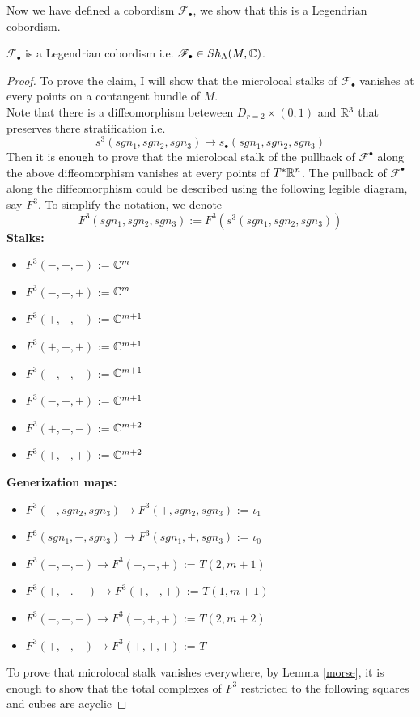 Now we have defined a cobordism $\mathscr{F}_\bullet$, we show that this is a Legendrian cobordism.
\begin{proposition}
$\mathscr{F}_\bullet$ is a Legendrian cobordism i.e. $\mathscr{F}_\bullet \in Sh_\Lambda(M,\mathbb{C})$.
\end{proposition}
\begin{proof}
To prove the claim, I will show that the microlocal stalks of $\mathscr{F}_\bullet$ vanishes at every points on a contangent bundle of $M$.\\
Note that there is a diffeomorphism beteween $D_{r=2} \times (0,1)$ and $\mathbb{R}^3$ that preserves there stratification i.e.
\[
s^3(sgn_1,sgn_2,sgn_3) \mapsto s_\bullet(sgn_1,sgn_2,sgn_3)
\]
Then it is enough to prove that the microlocal stalk of the pullback of $\mathscr{F}^\bullet$ along the above diffeomorphism vanishes at every points of $T^*\mathbb{R}^n$. The pullback of $\mathscr{F}^\bullet$ along the diffeomorphism could be described using the following legible diagram, say $F^3$. To simplify the notation, we denote
\[
F^3(sgn_1,sgn_2,sgn_3):= F^3(s^3(sgn_1,sgn_2,sgn_3))
\]
\textbf{Stalks:}
\begin{itemize}
\item $F^3(-,-,-)$ := $\mathbb{C}^m$
\item $F^3(-,-,+)$ := $\mathbb{C}^m$
\item $F^3(+,-,-)$ := $\mathbb{C}^{m+1}$
\item $F^3(+,-,+)$ := $\mathbb{C}^{m+1}$
\item $F^3(-,+,-)$ := $\mathbb{C}^{m+1}$
\item $F^3(-,+,+)$ := $\mathbb{C}^{m+1}$
\item $F^3(+,+,-)$ := $\mathbb{C}^{m+2}$
\item $F^3(+,+,+)$ := $\mathbb{C}^{m+2}$
\end{itemize}

\textbf{Generization maps:}
\begin{itemize}
\item $F^3(-,sgn_2,sgn_3)\rightarrow F^3(+,sgn_2,sgn_3)$ := $\iota_1$
\item $F^3(sgn_1,-,sgn_3)\rightarrow F^3(sgn_1,+,sgn_3)$ := $\iota_0$
\item $F^3(-,-,-)\rightarrow F^3(-,-,+)$ := $T(2,m+1)$
\item $F^3(+,-.-)\rightarrow F^3(+,-,+)$ := $T(1,m+1)$
\item $F^3(-,+,-)\rightarrow F^3(-,+,+)$ := $T(2,m+2)$
\item $F^3(+,+,-)\rightarrow F^3(+,+,+)$ := $T$
\end{itemize}
To prove that microlocal stalk vanishes everywhere, by Lemma \ref{morse}, it is enough to show that the total complexes of $F^3$ restricted to the following squares and cubes are acyclic


\end{proof}
